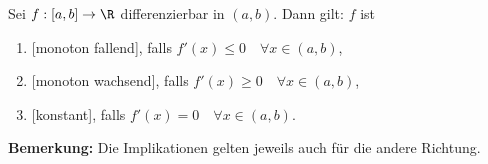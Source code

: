 Sei $f: [a, b] \to \R$ differenzierbar in $(a, b)$. Dann gilt: $f$ ist
\begin{enumerate}[label=\alph*)]
    \item {}[monoton fallend], falls $f'(x) \leq 0 \quad \forall x \in (a, b)$,
    \item {}[monoton wachsend], falls $f'(x) \geq 0 \quad \forall x \in (a, b)$,
    \item {}[konstant], falls $f'(x) = 0 \quad \forall x \in (a, b)$.
\end{enumerate}
\textbf{Bemerkung:} Die Implikationen gelten jeweils auch für die andere Richtung.